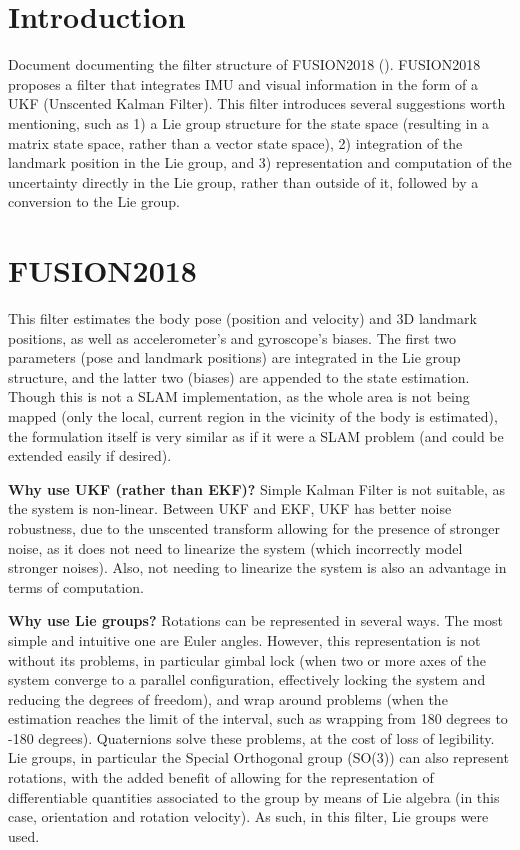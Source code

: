 \documentclass[10pt,twocolumn]{IEEEtran}
\begin{document}
\section{Introduction}

Document documenting the filter structure of FUSION2018 (\cite{brossard2017unscented}). FUSION2018 proposes a filter that integrates IMU and visual information in the form of a UKF (Unscented Kalman Filter). This filter introduces several suggestions worth mentioning, such as 1) a Lie group structure for the state space (resulting in a matrix state space, rather than a vector state space), 2) integration of the landmark position in the Lie group, and 3) representation and computation of the uncertainty directly in the Lie group, rather than outside of it, followed by a conversion to the Lie group.

\section{FUSION2018}

This filter estimates the body pose (position and velocity) and 3D landmark positions, as well as accelerometer's and gyroscope's biases. The first two parameters (pose and landmark positions) are integrated in the Lie group structure, and the latter two (biases) are appended to the state estimation. Though this is not a SLAM implementation, as the whole area is not being mapped (only the local, current region in the vicinity of the body is estimated), the formulation itself is very similar as if it were a SLAM problem (and could be extended easily if desired).

\textbf{Why use UKF (rather than EKF)?} Simple Kalman Filter is not suitable, as the system is non-linear. Between UKF and EKF, UKF has better noise robustness, due to the unscented transform allowing for the presence of stronger noise, as it does not need to linearize the system (which incorrectly model stronger noises). Also, not needing to linearize the system is also an advantage in terms of computation.

\textbf{Why use Lie groups?} Rotations can be represented in several ways. The most simple and intuitive one are Euler angles. However, this representation is not without its problems, in particular gimbal lock (when two or more axes of the system converge to a parallel configuration, effectively locking the system and reducing the degrees of freedom), and wrap around problems (when the estimation reaches the limit of the interval, such as wrapping from 180 degrees to -180 degrees). Quaternions solve these problems, at the cost of loss of legibility. Lie groups, in particular the Special Orthogonal group (SO(3)) can also represent rotations, with the added benefit of allowing for the representation of differentiable quantities associated to the group by means of Lie algebra (in this case, orientation and rotation velocity). As such, in this filter, Lie groups were used.
\end{document}
